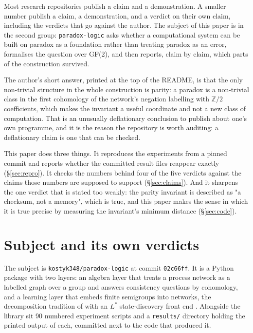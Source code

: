 \documentclass[11pt,a4paper]{article}
\begin{document}
Most research repositories publish a claim and a demonstration. A smaller number publish a
claim, a demonstration, and a verdict on their own claim, including the verdicts that go against
the author. The subject of this paper is in the second group: \texttt{paradox-logic}
\citep{paradoxlogic} asks whether a computational system can be built on paradox as a foundation
rather than treating paradox as an error, formalises the question over GF(2), and then reports,
claim by claim, which parts of the construction survived.

The author's short answer, printed at the top of the README, is that the only non-trivial
structure in the whole construction is parity: a paradox is a non-trivial class in the first
cohomology of the network's negation labelling with $\mathbb{Z}/2$ coefficients, which makes the
invariant a useful coordinate and not a new class of computation. That is an unusually deflationary
conclusion to publish about one's own programme, and it is the reason the repository is worth
auditing: a deflationary claim is one that can be checked.

This paper does three things. It reproduces the experiments from a pinned commit and reports
whether the committed result files reappear exactly (\S\ref{sec:repro}). It checks the numbers
behind four of the five verdicts against the claims those numbers are supposed to support
(\S\ref{sec:claims}). And it sharpens the one verdict that is stated too weakly: the parity
invariant is described as "a checksum, not a memory", which is true, and this paper makes the
sense in which it is true precise by measuring the invariant's minimum distance
(\S\ref{sec:code}).

\section{Subject and its own verdicts}
\label{sec:subject}

The subject is \texttt{kostyk348/\allowbreak{}paradox-logic} at commit \texttt{02c66ff}. It is a Python
package with two layers: an algebra layer that treats a process network as a labelled graph over
a group and answers consistency questions by cohomology, and a learning layer that embeds finite
semigroups into networks, the decomposition tradition of \citet{krohn1965} with an $L^*$
state-discovery front end \citep{angluin1987}. Alongside the library sit 90 numbered experiment scripts and a
\texttt{results/\allowbreak{}} directory holding the printed output of each, committed next to the code that
produced it.
\end{document}
